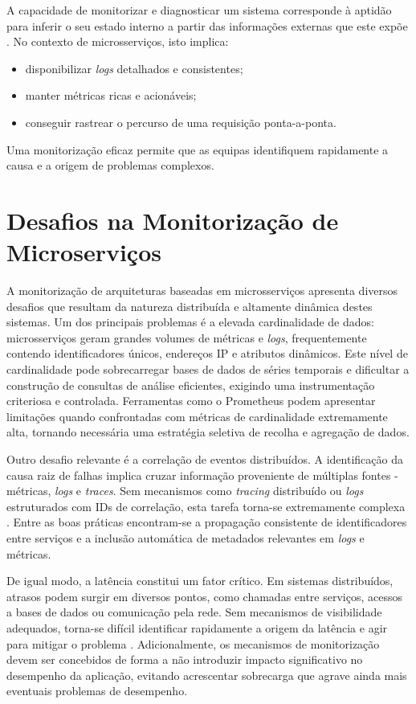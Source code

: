 A capacidade de monitorizar e diagnosticar um sistema corresponde à aptidão para inferir o seu estado interno a partir das informações externas que este expõe \cite{Kalman1960}. No contexto de microsserviços, isto implica:

\begin{itemize}
    \item disponibilizar \textit{logs} detalhados e consistentes;
    \item manter métricas ricas e acionáveis;
    \item conseguir rastrear o percurso de uma requisição ponta-a-ponta.
\end{itemize}

Uma monitorização eficaz permite que as equipas identifiquem rapidamente a causa e a origem de problemas complexos.


\section{Desafios na Monitorização de Microserviços}

A monitorização de arquiteturas baseadas em microsserviços apresenta diversos desafios que resultam da natureza distribuída e altamente dinâmica destes sistemas. Um dos principais problemas é a elevada cardinalidade de dados: microsserviços geram grandes volumes de métricas e \textit{logs}, frequentemente contendo identificadores únicos, endereços IP e atributos dinâmicos. Este nível de cardinalidade pode sobrecarregar bases de dados de séries temporais e dificultar a construção de consultas de análise eficientes, exigindo uma instrumentação criteriosa e controlada. Ferramentas como o Prometheus podem apresentar limitações quando confrontadas com métricas de cardinalidade extremamente alta, tornando necessária uma estratégia seletiva de recolha e agregação de dados.

Outro desafio relevante é a correlação de eventos distribuídos. A identificação da causa raiz de falhas implica cruzar informação proveniente de múltiplas fontes - métricas, \textit{logs} e \textit{traces}. Sem mecanismos como \textit{tracing} distribuído ou \textit{logs} estruturados com IDs de correlação, esta tarefa torna-se extremamente complexa \cite{Sigelman2010}. Entre as boas práticas encontram-se a propagação consistente de identificadores entre serviços e a inclusão automática de metadados relevantes em \textit{logs} e métricas.

De igual modo, a latência constitui um fator crítico. Em sistemas distribuídos, atrasos podem surgir em diversos pontos, como chamadas entre serviços, acessos a bases de dados ou comunicação pela rede. Sem mecanismos de visibilidade adequados, torna-se difícil identificar rapidamente a origem da latência e agir para mitigar o problema \cite{Railic2021}. Adicionalmente, os mecanismos de monitorização devem ser concebidos de forma a não introduzir impacto significativo no desempenho da aplicação, evitando acrescentar sobrecarga que agrave ainda mais eventuais problemas de desempenho.


